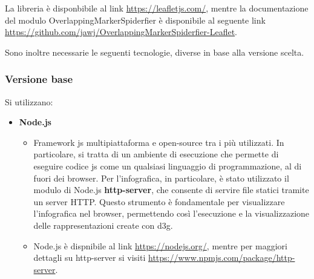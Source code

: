 La libreria è disponbibile al link \href{https://leafletjs.com/}{https://leafletjs.com/}, mentre la documentazione del modulo OverlappingMarkerSpiderfier è disponibile al seguente link \\
\href{https://github.com/jawj/OverlappingMarkerSpiderfier-Leaflet}{https://github.com/jawj/OverlappingMarkerSpiderfier-Leaflet}.

\bigskip
\noindent Sono inoltre necessarie le seguenti tecnologie, diverse in base alla versione scelta.
\subsubsection{Versione base}
Si utilizzano:
\begin{itemize}
    \item \textbf{Node.js} 
    \begin{itemize} 
        \item Framework \gls{js} multipiattaforma e open-source tra i più utilizzati. In particolare, si tratta di un ambiente di esecuzione che permette di eseguire codice \gls{js} 
        come un qualsiasi linguaggio di programmazione, al di fuori dei browser. 
        Per l'infografica, in particolare, è stato utilizzato il modulo di Node.js \textbf{http-server}, che consente di servire file statici tramite un server HTTP. Questo strumento è fondamentale per 
        visualizzare l'infografica nel browser, permettendo così l'esecuzione e la visualizzazione delle rappresentazioni create con \gls{d3g}.
        
        \item Node.js è dispnibile al link \href{https://nodejs.org/}{https://nodejs.org/}, mentre per maggiori dettagli su http-server si visiti \href{https://www.npmjs.com/package/http-server}{https://www.npmjs.com/package/http-server}.
    \end{itemize}
\end{itemize}

